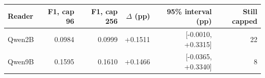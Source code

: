 \begin{tabular}{lrrrrr}
\toprule
Reader & F1, cap 96 & F1, cap 256 & $\Delta$ (pp) & 95\% interval (pp) & Still capped \\
\midrule
Qwen2B & 0.0984 & 0.0999 & +0.1511 & [-0.0010, +0.3315] & 22 \\
Qwen9B & 0.1595 & 0.1610 & +0.1466 & [-0.0365, +0.3340] & 8 \\
\bottomrule
\end{tabular}
